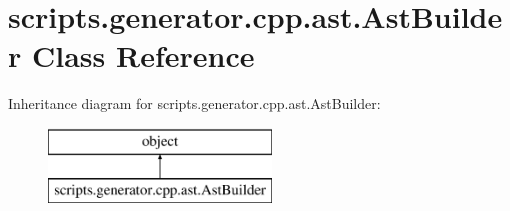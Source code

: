 \hypertarget{classscripts_1_1generator_1_1cpp_1_1ast_1_1_ast_builder}{}\section{scripts.\+generator.\+cpp.\+ast.\+Ast\+Builder Class Reference}
\label{classscripts_1_1generator_1_1cpp_1_1ast_1_1_ast_builder}
Inheritance diagram for scripts.\+generator.\+cpp.\+ast.\+Ast\+Builder\+:\begin{figure}[H]
\begin{center}
\leavevmode
\includegraphics[height=2.000000cm]{d1/d8c/classscripts_1_1generator_1_1cpp_1_1ast_1_1_ast_builder}
\end{center}
\end{figure}
